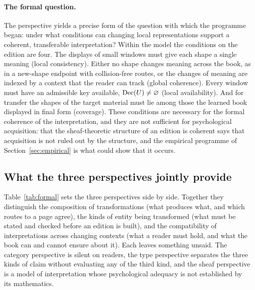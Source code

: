 \paragraph{The formal question.}
The perspective yields a precise form of the question with which the programme began: under what conditions can changing local representations support a coherent, transferable interpretation? Within the model the conditions on the edition are four. The displays of small windows must give each shape a single meaning (local consistency). Either no shape changes meaning across the book, as in a new-shape endpoint with collision-free routes, or the changes of meaning are indexed by a context that the reader can track (global coherence). Every window must have an admissible key available, $\mathrm{Dec}(U)\neq\varnothing$ (local availability). And for transfer the shapes of the target material must lie among those the learned book displayed in final form (coverage). These conditions are necessary for the formal coherence of the interpretation, and they are not sufficient for psychological acquisition: that the sheaf-theoretic structure of an edition is coherent says that acquisition is not ruled out by the structure, and the empirical programme of Section~\ref{sec:empirical} is what could show that it occurs.

\subsection{What the three perspectives jointly provide}

Table~\ref{tab:formal} sets the three perspectives side by side. Together they distinguish the composition of transformations (what produces what, and which routes to a page agree), the kinds of entity being transformed (what must be stated and checked before an edition is built), and the compatibility of interpretations across changing contexts (what a reader must hold, and what the book can and cannot ensure about it). Each leaves something unsaid. The category perspective is silent on readers, the type perspective separates the three kinds of claim without evaluating any of the third kind, and the sheaf perspective is a model of interpretation whose psychological adequacy is not established by its mathematics.

